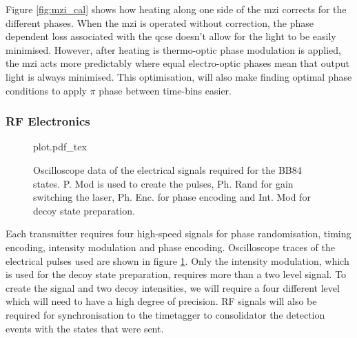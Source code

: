 Figure \ref{fig:mzi_cal} shows how heating along one side of the \ac{mzi} corrects for the different phases. When the \ac{mzi} is operated without correction, the phase dependent loss associated with the \ac{qcse} doesn't allow for the light to be easily minimised. However, after heating is thermo-optic phase modulation is applied, the \ac{mzi} acts more predictably where equal electro-optic phases mean that output light is always minimised. This optimisation, will also make finding optimal phase conditions to apply $\pi$ phase between time-bins easier.



\subsubsection*{RF Electronics}

\begin{figure}[tbp]
	\centering
	\def\svgwidth{\textwidth} 
	{plot.pdf_tex}
	\caption[Electrical signals for BB84 state generation]{Oscilloscope data of the electrical signals required for the BB84 states. P. Mod is used to create the pulses, Ph. Rand for gain switching the laser, Ph. Enc. for phase encoding and Int. Mod for decoy state preparation.}
	\label{fig:elec_signals}
\end{figure}


Each transmitter requires four high-speed signals for phase randomisation, timing encoding, intensity modulation and phase encoding. Oscilloscope traces of the electrical pulses used are shown in figure \ref{fig:elec_signals}. Only the intensity modulation, which is used for the decoy state preparation, requires more than a two level signal. To create the signal and two decoy intensities, we will require a four different level which will need to have a high degree of precision. RF signals will also be required for synchronisation to the timetagger to consolidator the detection events with the states that were sent. 

